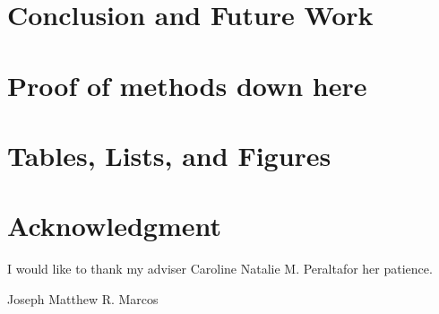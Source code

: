 \documentclass[journal]{./IEEE/IEEEtran}
\newcommand{\ADVISEE}{Joseph Matthew R. Marcos}
\newcommand{\ADVISER}{Caroline Natalie M. Peralta}
\begin{document}
\section{Conclusion and Future Work}

\appendices

\section{Proof of methods down here}

\newpage
\section{Tables, Lists, and Figures}
\newpage
\section*{Acknowledgment}
I would like to thank my adviser \ADVISER for her patience.

\begin{biography}{\ADVISEE}
\end{biography}


\newpage
% 


\end{document}
